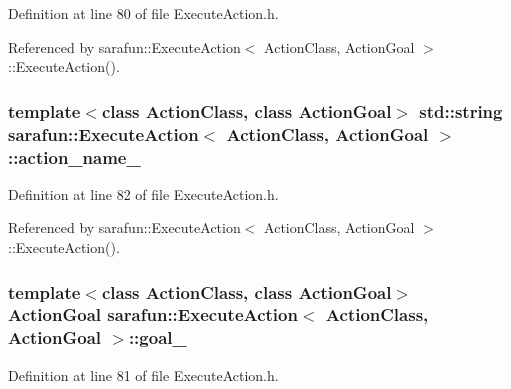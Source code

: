 Definition at line 80 of file Execute\-Action.\-h.



Referenced by sarafun\-::\-Execute\-Action$<$ Action\-Class, Action\-Goal $>$\-::\-Execute\-Action().

\hypertarget{classsarafun_1_1ExecuteAction_ac2deed790dd2ff6ef7534fb1a500381f_ac2deed790dd2ff6ef7534fb1a500381f}{
\subsubsection[{action\-\_\-name\-\_\-}]{\setlength{\rightskip}{0pt plus 5cm}template$<$class Action\-Class, class Action\-Goal$>$ std\-::string {\bf sarafun\-::\-Execute\-Action}$<$ Action\-Class, Action\-Goal $>$\-::action\-\_\-name\-\_\-\hspace{0.3cm}{\ttfamily [private]}}}\label{classsarafun_1_1ExecuteAction_ac2deed790dd2ff6ef7534fb1a500381f_ac2deed790dd2ff6ef7534fb1a500381f}


Definition at line 82 of file Execute\-Action.\-h.



Referenced by sarafun\-::\-Execute\-Action$<$ Action\-Class, Action\-Goal $>$\-::\-Execute\-Action().

\hypertarget{classsarafun_1_1ExecuteAction_a31d3f0c6e50b6abeb68ef6d0cb3c8a4a_a31d3f0c6e50b6abeb68ef6d0cb3c8a4a}{
\subsubsection[{goal\-\_\-}]{\setlength{\rightskip}{0pt plus 5cm}template$<$class Action\-Class, class Action\-Goal$>$ Action\-Goal {\bf sarafun\-::\-Execute\-Action}$<$ Action\-Class, Action\-Goal $>$\-::goal\-\_\-\hspace{0.3cm}{\ttfamily [private]}}}\label{classsarafun_1_1ExecuteAction_a31d3f0c6e50b6abeb68ef6d0cb3c8a4a_a31d3f0c6e50b6abeb68ef6d0cb3c8a4a}


Definition at line 81 of file Execute\-Action.\-h.


